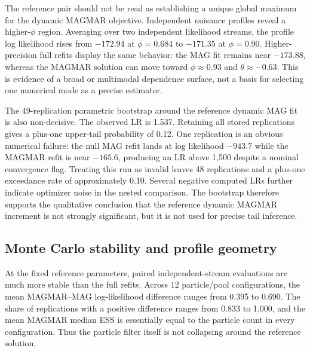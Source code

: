 \documentclass[11pt]{article}
\theoremstyle{definition}
\begin{document}
The reference pair should not be read as establishing a unique global maximum for
the dynamic MAGMAR objective. Independent nuisance profiles reveal a higher-$\phi$
region. Averaging over two independent likelihood streams, the profile log
likelihood rises from $-172.94$ at $\phi=0.684$ to $-171.35$ at $\phi=0.90$.
Higher-precision full refits display the same behavior: the MAG fit remains near
$-173.88$, whereas the MAGMAR solution can move toward $\phi\approx0.93$ and
$\theta\approx-0.63$. This is evidence of a broad or multimodal dependence surface,
not a basis for selecting one numerical mode as a precise estimator.


The 49-replication parametric bootstrap around the reference dynamic MAG fit is also
non-decisive. The observed LR is 1.537. Retaining all stored replications gives a
plus-one upper-tail probability of 0.12. One replication is an obvious numerical
failure: the null MAG refit lands at log likelihood $-943.7$ while the MAGMAR refit
is near $-165.6$, producing an LR above 1,500 despite a nominal convergence flag.
Treating this run as invalid leaves 48 replications and a plus-one exceedance rate of
approximately 0.10. Several negative computed LRs further indicate optimizer noise
in the nested comparison. The bootstrap therefore supports the qualitative
conclusion that the reference dynamic MAGMAR increment is not strongly significant,
but it is not used for precise tail inference.

\subsection{Monte Carlo stability and profile geometry}
\label{subsec:numerical-results}

At the fixed reference parameters, paired independent-stream evaluations are much
more stable than the full refits. Across 12 particle/pool configurations, the mean
MAGMAR--MAG log-likelihood difference ranges from 0.395 to 0.690. The share of
replications with a positive difference ranges from 0.833 to 1.000, and the mean
MAGMAR median ESS is essentially equal to the particle count in every configuration.
Thus the particle filter itself is not collapsing around the reference solution.
\end{document}
